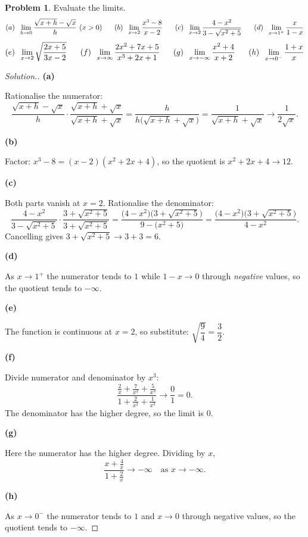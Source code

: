 \documentclass[11pt,a4paper]{article}
\theoremstyle{definition}
\newtheorem{problemx}{Problem}[subsection]
\newenvironment{problem}{\begin{problemx}}{\end{problemx}}
\newenvironment{solution}
  {\renewcommand{\qedsymbol}{}\begin{proof}[\textit{Solution}.]}
  {\end{proof}}
\newcommand{\subhead}[1]{%
  \par\medskip\noindent\textbf{#1}\par\nobreak\smallskip}
\begin{document}
\begin{problem}
Evaluate the limits.
$$(a)\hspace{0.2cm}\lim_{h\rightarrow 0}\frac{\sqrt{x+h}-\sqrt{x}}{h}\ (x>0)
\hspace{0.6cm}(b)\hspace{0.2cm}\lim_{x\rightarrow 2}\frac{x^3-8}{x-2}
\hspace{0.6cm}(c)\hspace{0.2cm}\lim_{x\rightarrow 2}\frac{4-x^2}{3-\sqrt{x^2+5}}
\hspace{0.6cm}(d)\hspace{0.2cm}\lim_{x\rightarrow 1^+}\frac{x}{1-x}$$
$$(e)\hspace{0.2cm}\lim_{x\rightarrow 2}\sqrt{\frac{2x+5}{3x-2}}
\hspace{0.6cm}(f)\hspace{0.2cm}\lim_{x\rightarrow\infty}\frac{2x^2+7x+5}{x^3+2x+1}
\hspace{0.6cm}(g)\hspace{0.2cm}\lim_{x\rightarrow-\infty}\frac{x^2+4}{x+2}
\hspace{0.6cm}(h)\hspace{0.2cm}\lim_{x\rightarrow 0^-}\frac{1+x}{x}$$
\end{problem}
\begin{solution}
\subhead{(a)}
Rationalise the numerator:
$$\frac{\sqrt{x+h}-\sqrt{x}}{h}\cdot\frac{\sqrt{x+h}+\sqrt{x}}{\sqrt{x+h}+\sqrt{x}}
= \frac{h}{h\big(\sqrt{x+h}+\sqrt{x}\big)}
= \frac{1}{\sqrt{x+h}+\sqrt{x}}\longrightarrow \frac{1}{2\sqrt{x}} .$$

\subhead{(b)}
Factor: $x^3-8 = (x-2)(x^2+2x+4)$, so the quotient is $x^2+2x+4\rightarrow 12$.

\subhead{(c)}
Both parts vanish at $x=2$. Rationalise the denominator:
$$\frac{4-x^2}{3-\sqrt{x^2+5}}\cdot\frac{3+\sqrt{x^2+5}}{3+\sqrt{x^2+5}}
= \frac{\big(4-x^2\big)\big(3+\sqrt{x^2+5}\big)}{9-\big(x^2+5\big)}
= \frac{\big(4-x^2\big)\big(3+\sqrt{x^2+5}\big)}{4-x^2}.$$
Cancelling gives $3+\sqrt{x^2+5}\rightarrow 3+3 = 6$.

\subhead{(d)}
As $x\rightarrow 1^+$ the numerator tends to $1$ while $1-x\rightarrow 0$
through \emph{negative} values, so the quotient tends to $-\infty$.

\subhead{(e)}
The function is continuous at $x=2$, so substitute:
$\sqrt{\dfrac{9}{4}} = \dfrac{3}{2}$.

\subhead{(f)}
Divide numerator and denominator by $x^3$:
$$\frac{\frac{2}{x} + \frac{7}{x^2} + \frac{5}{x^3}}{1 + \frac{2}{x^2} + \frac{1}{x^3}}
\longrightarrow \frac{0}{1} = 0 .$$
The denominator has the higher degree, so the limit is $0$.

\subhead{(g)}
Here the numerator has the higher degree. Dividing by $x$,
$$\frac{x + \frac{4}{x}}{1 + \frac{2}{x}} \longrightarrow -\infty
\quad\text{as } x\rightarrow -\infty .$$

\subhead{(h)}
As $x\rightarrow 0^-$ the numerator tends to $1$ and $x\rightarrow 0$ through
negative values, so the quotient tends to $-\infty$.
\end{solution}
\end{document}

